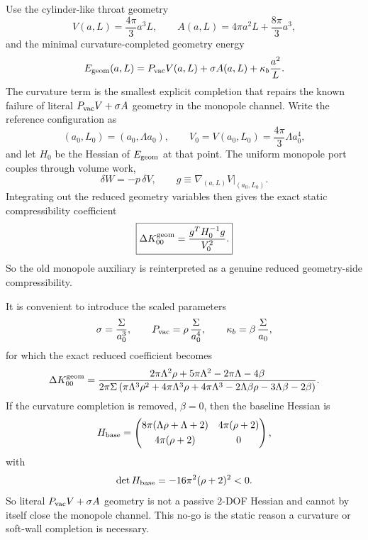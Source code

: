 \documentclass[11pt]{article}
\begin{document}
Use the cylinder-like throat geometry
\begin{equation}
V(a,L)=\frac{4\pi}{3}a^3L,
\qquad
A(a,L)=4\pi a^2L+\frac{8\pi}{3}a^3,
\label{eq:geom-breathing-VA}
\end{equation}
and the minimal curvature-completed geometry energy
\begin{equation}
E_{\rm geom}(a,L)
=
P_{\rm vac}V(a,L)+\sigma A(a,L)+\kappa_b\frac{a^2}{L}.
\label{eq:geom-breathing-Egeom}
\end{equation}
The curvature term is the smallest explicit completion that repairs the known failure of
literal \(P_{\rm vac}V+\sigma A\) geometry in the monopole channel.
Write the reference configuration as
\begin{equation}
(a_0,L_0)=(a_0,\Lambda a_0),
\qquad
V_0=V(a_0,L_0)=\frac{4\pi}{3}\Lambda a_0^4,
\label{eq:geom-breathing-reference}
\end{equation}
and let \(H_0\) be the Hessian of \(E_{\rm geom}\) at that point.
The uniform monopole port couples through volume work,
\begin{equation}
\delta W=-p\,\delta V,
\qquad
g\equiv \nabla_{(a,L)}V\big|_{(a_0,L_0)}.
\label{eq:geom-breathing-volume-work}
\end{equation}
Integrating out the reduced geometry variables then gives the exact static compressibility
coefficient
\begin{equation}
\boxed{
\Delta K_{00}^{\rm geom}
=
\frac{g^T H_0^{-1}g}{V_0^2}.
}
\label{eq:geom-breathing-static-compressibility}
\end{equation}
So the old monopole auxiliary is reinterpreted as a genuine reduced geometry-side
compressibility.

It is convenient to introduce the scaled parameters
\begin{equation}
\sigma=\frac{\Sigma}{a_0^3},
\qquad
P_{\rm vac}=\rho\,\frac{\Sigma}{a_0^4},
\qquad
\kappa_b=\beta\,\frac{\Sigma}{a_0},
\label{eq:geom-breathing-scaled-params}
\end{equation}
for which the exact reduced coefficient becomes
\begin{equation}
\Delta K_{00}^{\rm geom}
=
\frac{2\pi\Lambda^2\rho+5\pi\Lambda^2-2\pi\Lambda-4\beta}
{2\pi\Sigma\left(\pi\Lambda^3\rho^2+4\pi\Lambda^3\rho+4\pi\Lambda^3-2\Lambda\beta\rho-3\Lambda\beta-2\beta\right)}.
\label{eq:geom-breathing-exact-static-ratio}
\end{equation}
If the curvature completion is removed, \(\beta=0\), then the baseline Hessian is
\begin{equation}
H_{\rm base}
=
\begin{pmatrix}
8\pi(\Lambda\rho+\Lambda+2) & 4\pi(\rho+2)\\[3pt]
4\pi(\rho+2) & 0
\end{pmatrix},
\label{eq:geom-breathing-Hbase}
\end{equation}
with
\begin{equation}
\det H_{\rm base}=-16\pi^2(\rho+2)^2<0.
\label{eq:geom-breathing-Hbase-det}
\end{equation}
So literal \(P_{\rm vac}V+\sigma A\) geometry is not a passive \(2\)-DOF Hessian and
cannot by itself close the monopole channel.
This no-go is the static reason a curvature or soft-wall completion is necessary.
\end{document}
